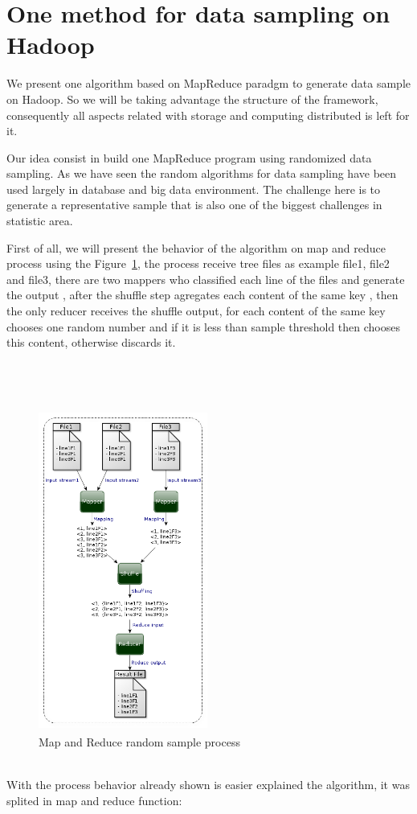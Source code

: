 \section{One method for data sampling on Hadoop}

We present one algorithm based on MapReduce paradgm to generate data sample on Hadoop.
So we will be taking advantage the structure of the framework, consequently all
aspects related with storage and computing distributed is left for it.

Our idea consist in build one MapReduce program using randomized data sampling.
As we have seen the random algorithms for data sampling have been used largely in
database and big data environment. The challenge here is to generate a representative
sample that is also one of the biggest challenges in statistic area.

First of all, we will present the behavior of the algorithm on map and reduce process
using the Figure~\ref{fig:sampleProcess}, the process receive tree files as example
file1, file2 and file3, there are two mappers who classified each line of the files
and generate the output , after the shuffle step
agregates each content of the same key
,
then the only reducer receives the shuffle output, for each content of the same key
chooses one random number and if it is less than sample threshold then chooses this
content, otherwise discards it.
\\
\\
\\
\\
\begin{figure}[htbp]
	\centering
	\includegraphics[width=210px,height=400px]{img/sampleProcess.png}
	\caption{Map and Reduce random sample process}\label{fig:sampleProcess}
\end{figure}
\\
With the process behavior already shown is easier explained the algorithm, it was
splited in map and reduce function:

